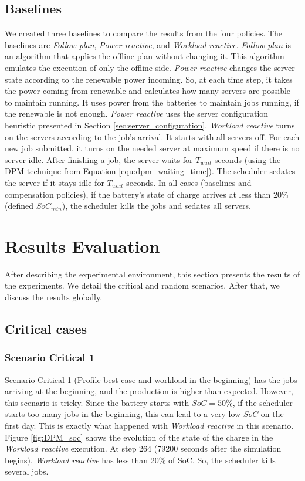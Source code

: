\subsection{Baselines}
We created three baselines to compare the results from the four policies. The baselines are \emph{Follow plan}, \emph{Power reactive}, and \emph{Workload reactive}. \emph{Follow plan} is an algorithm that applies the offline plan without changing it. This algorithm emulates the execution of only the offline side. \emph{Power reactive} changes the server state according to the renewable power incoming. So, at each time step, it takes the power coming from renewable and calculates how many servers are possible to maintain running. It uses power from the batteries to maintain jobs running, if the renewable is not enough. \emph{Power reactive} uses the server configuration heuristic presented in Section \ref{sec:server_configuration}. \emph{Workload reactive} turns on the servers according to the job's arrival. It starts with all servers off. For each new job submitted, it turns on the needed server at maximum speed if there is no server idle. After finishing a job, the server waits for $T_{wait}$ seconds (using the DPM technique from Equation \ref{equ:dpm_waiting_time}). The scheduler sedates the server if it stays idle for $T_{wait}$ seconds. In all cases (baselines and compensation policies), if the battery's state of charge arrives at less than 20\% (defined $SoC_{min}$), the scheduler kills the jobs and sedates all servers. 

\section{Results Evaluation}

After describing the experimental environment, this section presents the results of the experiments. We detail the critical and random scenarios. After that, we discuss the results globally.

\subsection{Critical cases}

\subsubsection{Scenario Critical 1}
Scenario Critical 1 (Profile best-case and workload in the beginning) has the jobs arriving at the beginning, and the production is higher than expected. However, this scenario is tricky. Since the battery starts with $SoC = 50\%$, if the scheduler starts too many jobs in the beginning, this can lead to a very low $SoC$ on the first day. This is exactly what happened with \emph{Workload reactive} in this scenario. Figure \ref{fig:DPM_soc} shows the evolution of the state of the charge in the \emph{Workload reactive} execution. At step 264 (79200 seconds after the simulation begins), \emph{Workload reactive} has less than 20\% of SoC. So, the scheduler kills several jobs. 

